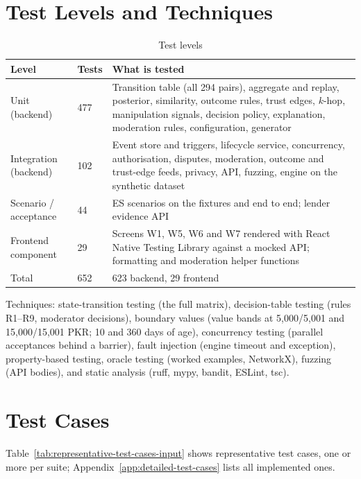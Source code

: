 \section{Test Levels and Techniques}\label{sec:test-levels-techniques}
\begin{table}[H]
\centering
\caption{Test levels}\label{tab:test-levels}
\begin{tabular}{@{}L{68pt}L{39pt}L{268pt}@{}}
\toprule
Level & Tests & What is tested \\
\midrule
Unit (backend) & 477 & Transition table (all 294 pairs), aggregate and replay, posterior, similarity, outcome rules, trust edges, $k$-hop, manipulation signals, decision policy, explanation, moderation rules, configuration, generator \\
Integration (backend) & 102 & Event store and triggers, lifecycle service, concurrency, authorisation, disputes, moderation, outcome and trust-edge feeds, privacy, API, fuzzing, engine on the synthetic dataset \\
Scenario / acceptance & 44 & ES scenarios on the fixtures and end to end; lender evidence API \\
Frontend component & 29 & Screens W1, W5, W6 and W7 rendered with React Native Testing Library against a mocked API; formatting and moderation helper functions \\
Total & 652 & 623 backend, 29 frontend \\
\bottomrule
\end{tabular}
\end{table}
Techniques: state-transition testing (the full matrix), decision-table testing (rules R1--R9, moderator decisions), boundary values (value bands at 5,000/5,001 and 15,000/15,001 PKR; 10 and 360 days of age), concurrency testing (parallel acceptances behind a barrier), fault injection (engine timeout and exception), property-based testing, oracle testing (worked examples, NetworkX), fuzzing (API bodies), and static analysis (ruff, mypy, bandit, ESLint, tsc).

\section{Test Cases}\label{sec:test-cases}
Table~\ref{tab:representative-test-cases-input} shows representative test cases, one or more per suite; Appendix~\ref{app:detailed-test-cases} lists all implemented ones.

